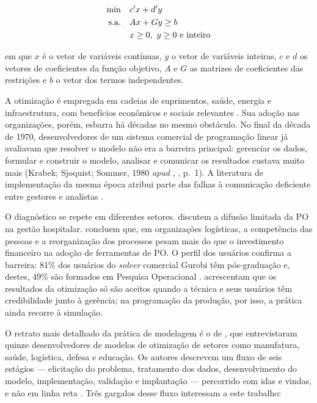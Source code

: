 \begin{align}
  \min \quad & c'x + d'y \notag \\
  \text{s.a.} \quad & Ax + Gy \geq b \label{eq:milp} \\
  & x \geq 0,\ y \geq 0 \text{ e inteiro} \notag
\end{align}

em que $x$ é o vetor de variáveis contínuas, $y$ o vetor de variáveis inteiras, $c$ e $d$ os vetores de coeficientes da função objetivo, $A$ e $G$ as matrizes de coeficientes das restrições e $b$ o vetor dos termos independentes.

A otimização é empregada em cadeias de suprimentos, saúde, energia e infraestrutura, com benefícios econômicos e sociais relevantes \cite{wasserkrug2025}. Sua adoção nas organizações, porém, esbarra há décadas no mesmo obstáculo. No final da década de 1970, desenvolvedores de um sistema comercial de programação linear já avaliavam que resolver o modelo não era a barreira principal: gerenciar os dados, formular e construir o modelo, analisar e comunicar os resultados custava muito mais (Krabek; Sjoquist; Sommer, 1980 \textit{apud} \citeauthor{fourer2012}, \citeyear{fourer2012}, p.~1). A literatura de implementação da mesma época atribui parte das falhas à comunicação deficiente entre gestores e analistas \cite{henderson1980}.

O diagnóstico se repete em diferentes setores.  discutem a difusão limitada da PO na gestão hospitalar.  concluem que, em organizações logísticas, a competência das pessoas e a reorganização dos processos pesam mais do que o investimento financeiro na adoção de ferramentas de PO. O perfil dos usuários confirma a barreira: 81\% dos usuários do \textit{solver} comercial Gurobi têm pós-graduação e, destes, 49\% são formados em Pesquisa Operacional \cite[p.~1]{ahmaditeshnizi2026}.  acrescentam que os resultados da otimização só são aceitos quando a técnica e seus usuários têm credibilidade junto à gerência; na programação da produção, por isso, a prática ainda recorre à simulação.

O retrato mais detalhado da prática de modelagem é o de , que entrevistaram quinze desenvolvedores de modelos de otimização de setores como manufatura, saúde, logística, defesa e educação. Os autores descrevem um fluxo de seis estágios --- elicitação do problema, tratamento dos dados, desenvolvimento do modelo, implementação, validação e implantação --- percorrido com idas e vindas, e não em linha reta \cite[p.~6]{lawless2025}. Três gargalos desse fluxo interessam a este trabalho:

